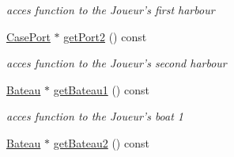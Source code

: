 \begin{DoxyCompactItemize}
\begin{DoxyCompactList}\small\item\em acces function to the Joueur's first harbour \item\end{DoxyCompactList}\item 
\hypertarget{class_joueur_a5a9fd927f12a6cd31c2cd7c20afae3f2}{
\hyperlink{class_case_port}{CasePort} $\ast$ \hyperlink{class_joueur_a5a9fd927f12a6cd31c2cd7c20afae3f2}{getPort2} () const }
\label{class_joueur_a5a9fd927f12a6cd31c2cd7c20afae3f2}

\begin{DoxyCompactList}\small\item\em acces function to the Joueur's second harbour \item\end{DoxyCompactList}\item 
\hypertarget{class_joueur_a84e2f3852269cc5543aa6c0ab944b9d9}{
\hyperlink{class_bateau}{Bateau} $\ast$ \hyperlink{class_joueur_a84e2f3852269cc5543aa6c0ab944b9d9}{getBateau1} () const }
\label{class_joueur_a84e2f3852269cc5543aa6c0ab944b9d9}

\begin{DoxyCompactList}\small\item\em acces function to the Joueur's boat 1 \item\end{DoxyCompactList}\item 
\hypertarget{class_joueur_adc333af6ffa8250446cf4bec4354afbe}{
\hyperlink{class_bateau}{Bateau} $\ast$ \hyperlink{class_joueur_adc333af6ffa8250446cf4bec4354afbe}{getBateau2} () const }
\label{class_joueur_adc333af6ffa8250446cf4bec4354afbe}


\end{DoxyCompactItemize}
